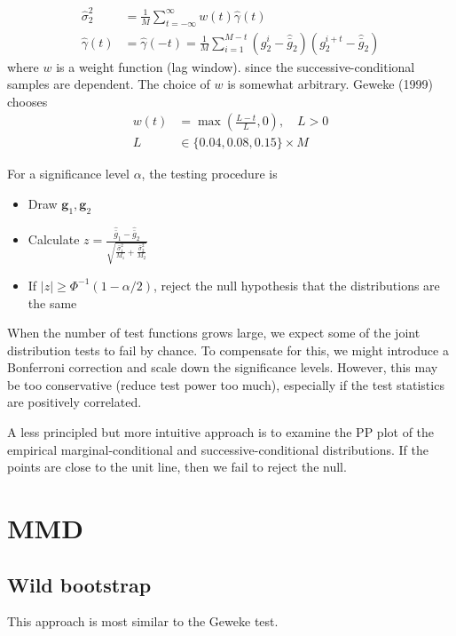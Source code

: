 \documentclass{article}
\begin{document}
\begin{align*}
    \hat{\sigma}_{2}^{2} &= \frac{1}{M}\sum_{t=-\infty}^{\infty} w(t) \hat{\gamma}(t) \\
    \hat{\gamma}(t) &= \hat{\gamma}(-t) = \frac{1}{M}\sum_{i=1}^{M-t}(g_{2}^{i} - \hat{\bar{g}}_{2})(g_{2}^{i+t} - \hat{\bar{g}}_{2})
\end{align*}
where $w$ is a weight function (lag window). since the successive-conditional samples are dependent. The choice of $w$ is somewhat arbitrary. Geweke (1999) chooses
\begin{align*}
    w(t) &= \max{\left(\frac{L-t}{L}, 0\right)}, \quad L > 0 \\
    L &\in \{0.04, 0.08, 0.15\} \times M
\end{align*}

For a significance level $\alpha$, the testing procedure is
\begin{itemize}
    \item Draw $\mathbf{g}_{1}, \mathbf{g}_{2}$
    \item Calculate $z=\frac{\hat{\bar{g}}_{1} - \hat{\bar{g}}_{2}}{\sqrt{ \frac{\hat{\sigma}^{2}_{1}}{M_{1}} + \frac{\hat{\sigma}^{2}_{2}}{M_{2}}}}$
    \item If $|z| \geq \Phi^{-1}(1-\alpha/2)$, reject the null hypothesis that the distributions are the same
\end{itemize}

When the number of test functions grows large, we expect some of the joint distribution tests to fail by chance. To compensate for this, we might introduce a Bonferroni correction and scale down the significance levels. However, this may be too conservative (reduce test power too much), especially if the test statistics are positively correlated. 

A less principled but more intuitive approach is to examine the PP plot of the empirical marginal-conditional and successive-conditional distributions. If the points are close to the unit line, then we fail to reject the null.

\section{MMD}

\subsection{Wild bootstrap}
This approach is most similar to the Geweke test.
\end{document}
